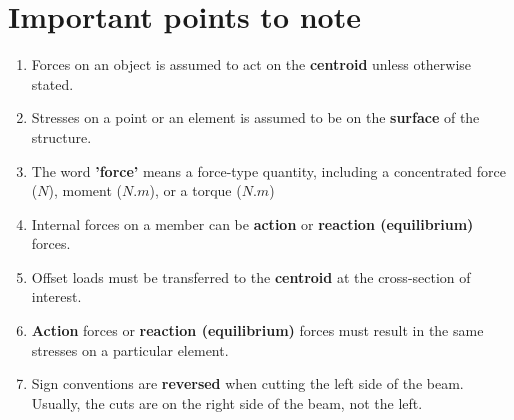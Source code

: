 \documentclass[11pt]{article}
\begin{document}
\section{Important points to note}
\label{sec:orgecc617e}
\begin{enumerate}
\item Forces on an object is assumed to act on the \textbf{centroid} unless otherwise stated.
\item Stresses on a point or an element is assumed to be on the \textbf{surface} of the structure.
\item The word \textbf{'force'} means a force-type quantity, including a concentrated force (\(\unit{N}\)), moment (\(\unit{N.m}\)), or a torque (\(\unit{N.m}\))
\item Internal forces on a member can be \textbf{action} or \textbf{reaction (equilibrium)} forces.
\item Offset loads must be transferred to the \textbf{centroid} at the cross-section of interest.
\item \textbf{Action} forces or \textbf{reaction (equilibrium)} forces must result in the same stresses on a particular element.
\item Sign conventions are \textbf{reversed} when cutting the left side of the beam. Usually, the cuts are on the right side of the beam, not the left.
\end{enumerate}
\end{document}
